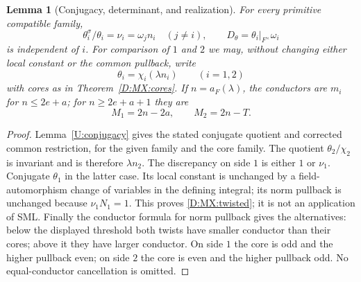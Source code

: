 \documentclass[11pt]{amsart}
\newtheorem{lemma}[theorem]{Lemma}
\theoremstyle{definition}
\theoremstyle{remark}
\begin{document}
\begin{lemma}[Conjugacy, determinant, and realization]\label{D:MX:realize}
For every primitive compatible family,
\[
 \theta_i^\sigma/\theta_i=\nu_i=\omega_jn_i\quad(j\ne i),\qquad
 D_\theta=\theta_i|_{F^\times}\omega_i
\]
is independent of $i$. For comparison of $1$ and $2$ we may, without
changing either local constant or the common pullback, write
\begin{equation}\label{D:MX:twisted}
 \theta_i=\chi_i(\lambda n_i)\qquad(i=1,2)
\end{equation}
with cores as in Theorem~\ref{D:MX:cores}. If $n=a_F(\lambda)$, the conductors
are $m_i$ for $n\le2e+a$; for $n\ge2e+a+1$ they are
\begin{equation}\label{D:MX:higher-conductors}
 M_1=2n-2a,\qquad M_2=2n-T.
\end{equation}
\end{lemma}
\begin{proof}
Lemma~\ref{U:conjugacy} gives the stated conjugate quotient and
corrected common restriction, for the given family and the core family.
The quotient $\theta_2/\chi_2$ is invariant and is therefore $\lambda n_2$.
The discrepancy on side $1$ is either $1$ or $\nu_1$.
Conjugate $\theta_1$ in the latter case. Its local constant is unchanged
by a field-automorphism change of variables in the defining integral;
its norm pullback is unchanged because $\nu_1N_1=1$.
This proves \eqref{D:MX:twisted}; it is not an application of SML.
Finally the conductor formula for norm pullback gives the alternatives:
below the displayed threshold both twists have smaller conductor than
their cores; above it they have larger conductor. On side $1$ the core
is odd and the higher pullback even; on side $2$ the core is even and the
higher pullback odd. No equal-conductor cancellation is omitted.
\end{proof}
\end{document}
